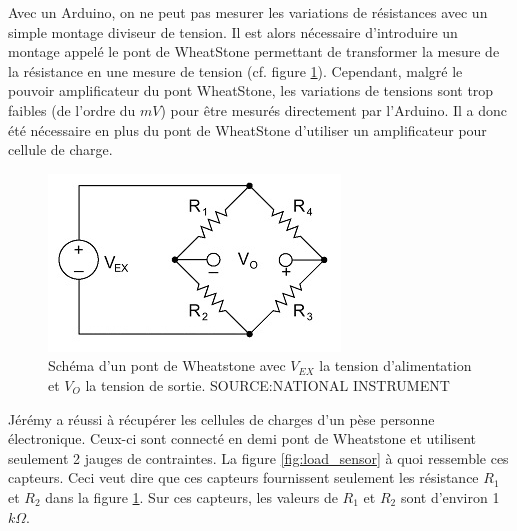\documentclass{polytech/polytech}
\begin{document}
Avec un Arduino, on ne peut pas mesurer les variations de résistances avec un simple montage diviseur de tension. Il est alors nécessaire d'introduire un montage appelé le pont de WheatStone permettant de transformer la mesure de la résistance en une mesure de tension (cf. figure \ref{fig:wheatstone_bridge}). Cependant, malgré le pouvoir amplificateur
du pont WheatStone, les variations de tensions sont trop faibles (de l'ordre du $mV$) pour être mesurés directement par l'Arduino. Il a donc été nécessaire en plus du pont de WheatStone d'utiliser un amplificateur pour cellule de charge.

\begin{figure}
\begin{center}
\includegraphics[scale=1]{image/wheatstone_bridge.jpg}
\end{center}
\caption{Schéma d'un pont de Wheatstone avec $V_{EX}$ la tension d'alimentation et $V_O$ la tension de sortie. SOURCE:NATIONAL INSTRUMENT}
\label{fig:wheatstone_bridge}
\end{figure}

Jérémy a réussi à récupérer les cellules de charges d'un pèse personne électronique. Ceux-ci sont connecté en demi pont de Wheatstone et utilisent seulement 2 jauges de contraintes. La figure \ref{fig:load_sensor} à quoi ressemble ces capteurs. Ceci veut dire que ces capteurs fournissent seulement les résistance $R_1$ et $R_2$ dans la figure \ref{fig:wheatstone_bridge}. Sur ces capteurs, les valeurs  de $R_1$ et $R_2$ sont d'environ 1$k\Omega$.
\end{document}
